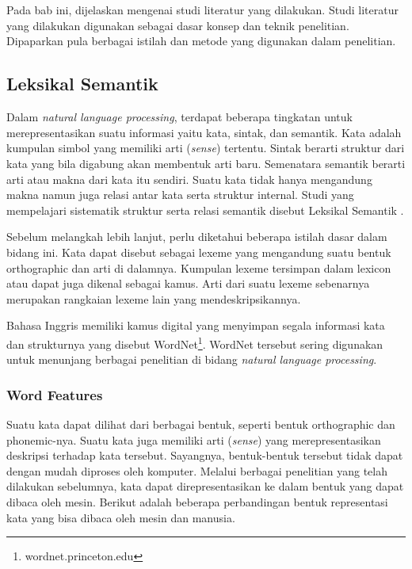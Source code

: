 \chapter{\babDua}
Pada bab ini, dijelaskan mengenai studi literatur yang dilakukan. Studi literatur yang dilakukan digunakan sebagai dasar konsep dan teknik penelitian. Dipaparkan pula berbagai istilah dan metode yang digunakan dalam penelitian.


\section{Leksikal Semantik}
Dalam \textit{natural language processing}, terdapat beberapa tingkatan untuk merepresentasikan suatu informasi yaitu kata, sintak, dan semantik. Kata adalah kumpulan simbol yang memiliki arti (\textit{sense}) tertentu. Sintak berarti struktur dari kata yang bila digabung akan membentuk arti baru. Semenatara semantik berarti arti atau makna dari kata itu sendiri. Suatu kata tidak hanya mengandung makna namun juga relasi antar kata serta struktur internal. Studi yang mempelajari sistematik struktur serta relasi semantik disebut Leksikal Semantik \citep{jurafsky2000speech}. %

Sebelum melangkah lebih lanjut, perlu diketahui beberapa istilah dasar dalam bidang ini. Kata dapat disebut sebagai lexeme yang mengandung suatu bentuk orthographic dan arti di dalamnya. Kumpulan lexeme tersimpan dalam lexicon atau dapat juga dikenal sebagai kamus. Arti dari suatu lexeme sebenarnya merupakan rangkaian lexeme lain yang mendeskripsikannya.

Bahasa Inggris memiliki kamus digital yang menyimpan segala informasi kata dan strukturnya yang disebut WordNet\footnote{wordnet.princeton.edu}. WordNet tersebut sering digunakan untuk menunjang berbagai penelitian di bidang \textit{natural language processing}. 

\subsection{Word Features}
Suatu kata dapat dilihat dari berbagai bentuk, seperti bentuk orthographic dan phonemic-nya. Suatu kata juga memiliki arti (\textit{sense}) yang merepresentasikan deskripsi terhadap kata tersebut. Sayangnya, bentuk-bentuk tersebut tidak dapat dengan mudah diproses oleh komputer. Melalui berbagai penelitian yang telah dilakukan sebelumnya, kata dapat direpresentasikan ke dalam bentuk yang dapat dibaca oleh mesin. Berikut adalah beberapa perbandingan bentuk representasi kata yang bisa dibaca oleh mesin dan manusia.

